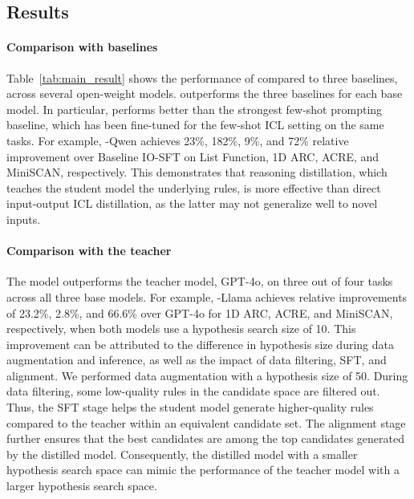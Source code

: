 \subsection{Results}
\paragraph{Comparison with baselines} Table~\ref{tab:main_result} shows the performance of \proposed compared to three baselines, across several open-weight models. \proposed outperforms the three baselines for each base model. In particular, \proposed performs better than the strongest few-shot prompting baseline, which has been fine-tuned for the few-shot ICL setting on the same tasks. For example, \proposed-Qwen achieves 23\%, 182\%, 9\%, and 72\% relative improvement over Baseline IO-SFT on List Function, 1D ARC, ACRE, and MiniSCAN, respectively. This demonstrates that reasoning distillation, which teaches the student model the underlying rules, is more effective than direct input-output ICL distillation, as the latter may not generalize well to novel inputs.

\paragraph{Comparison with the teacher} The \proposed model outperforms the teacher model, GPT-4o, on three out of four tasks across all three base models. For example, \proposed-Llama achieves relative improvements of 23.2\%, 2.8\%, and 66.6\% over GPT-4o for 1D ARC, ACRE, and MiniSCAN, respectively, when both models use a hypothesis search size of 10. This improvement can be attributed to the difference in hypothesis size during data augmentation and inference, as well as the impact of data filtering, SFT, and alignment. We performed data augmentation with a hypothesis size of 50. During data filtering, some low-quality rules in the candidate space are filtered out. Thus, the SFT stage helps the student model generate higher-quality rules compared to the teacher within an equivalent candidate set. The alignment stage further ensures that the best candidates are among the top candidates generated by the distilled model. Consequently, the distilled model with a smaller hypothesis search space can mimic the performance of the teacher model with a larger hypothesis search space.


